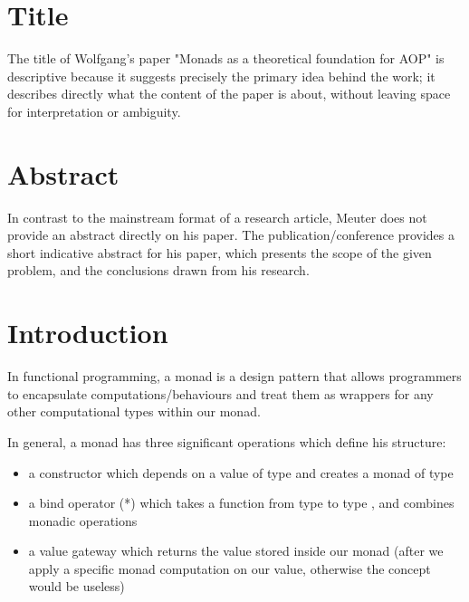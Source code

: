 \documentclass[twocolumn, 9pt]{article}
\begin{document}
\maketitle




\section{Title}

The title of Wolfgang’s paper "Monads as a theoretical foundation for AOP" is descriptive because it suggests precisely the primary idea behind the work; it describes directly what the content of the paper is about, without leaving space for interpretation or ambiguity.

\section{Abstract}

In contrast to the mainstream format of a research article, Meuter does not provide an abstract directly on his paper. The publication/conference provides a short indicative abstract for his paper, which presents the scope of the given problem, and the conclusions drawn from his research.


\section{Introduction}

\begin{definition}
In functional programming, a monad is a design pattern that allows programmers to encapsulate computations/behaviours and treat them as wrappers for any other computational types within our monad. \cite{wiki:monad}
\end{definition}

In general, a monad has three significant operations which define his structure: \cite{wiki:monad}
\begin{itemize}
    \item a constructor which depends on a value of type  and creates a monad of type  
    \item a bind operator (*) which takes a function from type  to type , and combines monadic operations 
    \item a value gateway which returns the value stored inside our monad (after we apply a specific monad computation on our value, otherwise the concept would be useless) 
\end{itemize}
\end{document}
